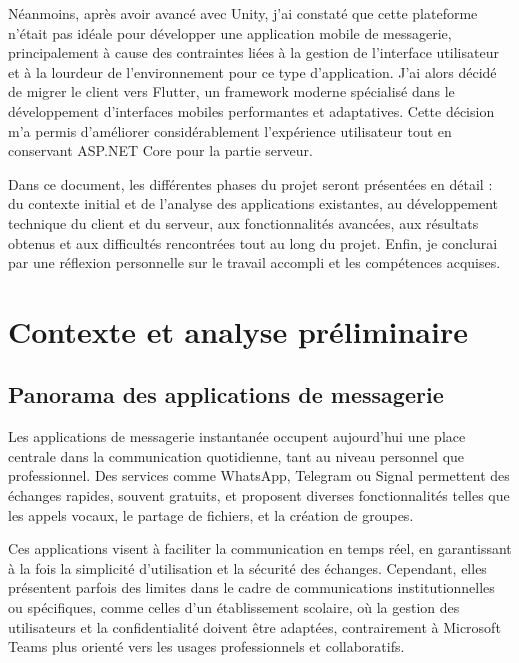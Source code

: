 \documentclass[12pt]{report}
\begin{document}
	Néanmoins, après avoir avancé avec Unity\supercite{visualstudio}, j’ai constaté que cette plateforme n’était pas idéale pour développer une application mobile de messagerie, principalement à cause des contraintes liées à la gestion de l’interface utilisateur et à la lourdeur de l’environnement pour ce type d’application. J’ai alors décidé de migrer le client vers Flutter\supercite{flutter}, un framework moderne spécialisé dans le développement d’interfaces mobiles performantes et adaptatives. Cette décision m’a permis d’améliorer considérablement l’expérience utilisateur tout en conservant ASP.NET Core\supercite{aspnetcore} pour la partie serveur.
	
	Dans ce document, les différentes phases du projet seront présentées en détail : du contexte initial et de l’analyse des applications existantes, au développement technique du client et du serveur, aux fonctionnalités avancées, aux résultats obtenus et aux difficultés rencontrées tout au long du projet. Enfin, je conclurai par une réflexion personnelle sur le travail accompli et les compétences acquises.
	
	\chapter{Contexte et analyse préliminaire}
	
	\section{Panorama des applications de messagerie}
	
	Les applications de messagerie instantanée occupent aujourd’hui une place centrale dans la communication quotidienne, tant au niveau personnel que professionnel. Des services comme WhatsApp\supercite{whatsapp}, Telegram\supercite{telegram} ou Signal\supercite{signal} permettent des échanges rapides, souvent gratuits, et proposent diverses fonctionnalités telles que les appels vocaux, le partage de fichiers, et la création de groupes.
	
	Ces applications visent à faciliter la communication en temps réel, en garantissant à la fois la simplicité d’utilisation et la sécurité des échanges. Cependant, elles présentent parfois des limites dans le cadre de communications institutionnelles ou spécifiques, comme celles d’un établissement scolaire, où la gestion des utilisateurs et la confidentialité doivent être adaptées, contrairement à Microsoft Teams\supercite{teams} plus orienté vers les usages professionnels et collaboratifs.
	
\end{document}
